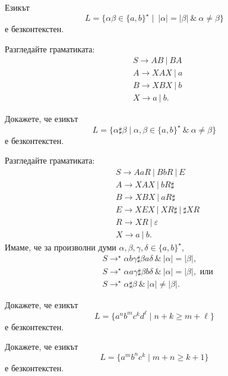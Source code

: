 \begin{problem}
  \label{prob:equal-but-different}
  Езикът
  \[L = \{\alpha\beta \in \{a,b\}^\star \mid\ |\alpha| = |\beta|\ \&\ \alpha \neq \beta\}\]
  е безконтекстен.
\end{problem}
\begin{hint}
  Разгледайте граматиката:
  \begin{align*}
    & S \to AB\ |\ BA\\
    & A \to XAX\ |\ a\\
    & B \to XBX\ |\ b\\
    & X \to a\ |\ b.
  \end{align*}
\end{hint}

\begin{problem}
 Докажете, че езикът
 \[L = \{\alpha \sharp \beta \mid \alpha,\beta \in \{a,b\}^\star\ \&\ \alpha \neq \beta \}\]
 е безконтекстен.
\end{problem}
\begin{hint}
  Разгледайте граматиката:
  \begin{align*}
    & S \to AaR\ |\ BbR\ |\ E\\
    & A \to XAX\ |\ bR\sharp\\
    & B \to XBX\ |\ aR\sharp\\
    & E \to XEX\ |\ XR\sharp\ |\ \sharp XR\\
    & R \to XR\ |\ \varepsilon\\
    & X \to a\ |\ b.
  \end{align*}
  Имаме, че за произволни думи $\alpha,\beta,\gamma,\delta \in \{a,b\}^\star$,
  \begin{align*}
    & S \to^\star \alpha b \gamma \sharp \beta a \delta\ \&\ |\alpha| = |\beta|,\\
    & S \to^\star \alpha a \gamma \sharp \beta b \delta\ \&\ |\alpha| = |\beta|, \text{ или}\\
    & S \to^\star \alpha \sharp \beta\ \&\ |\alpha| \neq |\beta|.
  \end{align*}      
\end{hint}






\begin{problem}
  Докажете, че езикът 
  \[L = \{a^nb^mc^kd^\ell \mid n+k \geq m + \ell\}\]
  е безконтекстен.
\end{problem}

\begin{problem}
  Докажете, че езикът 
  \[L = \{a^mb^nc^k\mid m+n \geq k + 1\}\]
  е безконтекстен.  
\end{problem}

